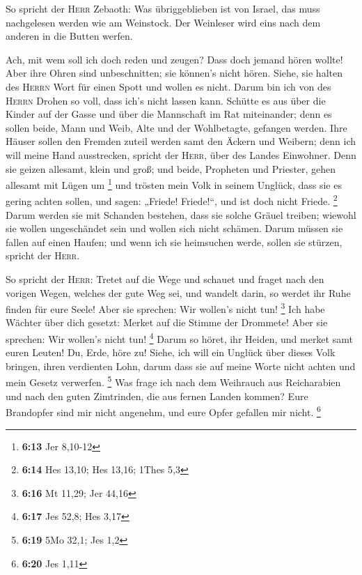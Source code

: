  So spricht der \textsc{Herr} Zebaoth: Was übriggeblieben
ist von Israel, das muss nachgelesen werden wie am Weinstock. Der
Weinleser wird eins nach dem anderen in die Butten werfen.

 Ach, mit wem soll ich doch reden und zeugen? Dass doch
jemand hören wollte! Aber ihre Ohren sind unbeschnitten; sie können's
nicht hören. Siehe, sie halten des \textsc{Herrn} Wort für einen Spott
und wollen es nicht.  Darum bin ich von des
\textsc{Herrn} Drohen so voll, dass ich's nicht lassen kann. Schütte es
aus über die Kinder auf der Gasse und über die Mannschaft im Rat
miteinander; denn es sollen beide, Mann und Weib, Alte und der
Wohlbetagte, gefangen werden.  Ihre Häuser sollen den
Fremden zuteil werden samt den Äckern und Weibern; denn ich will meine
Hand ausstrecken, spricht der \textsc{Herr}, über des Landes Einwohner.
 Denn sie geizen allesamt, klein und groß; und beide,
Propheten und Priester, gehen allesamt mit Lügen um \footnote{\textbf{6:13}
  Jer 8,10-12}  und trösten mein Volk in seinem Unglück,
dass sie es gering achten sollen, und sagen: „Friede! Friede!{}``, und
ist doch nicht Friede. \footnote{\textbf{6:14} Hes 13,10; Hes 13,16;
  1Thes 5,3}  Darum werden sie mit Schanden bestehen,
dass sie solche Gräuel treiben; wiewohl sie wollen ungeschändet sein und
wollen sich nicht schämen. Darum müssen sie fallen auf einen Haufen; und
wenn ich sie heimsuchen werde, sollen sie stürzen, spricht der
\textsc{Herr}.

 So spricht der \textsc{Herr}: Tretet auf die Wege und
schauet und fraget nach den vorigen Wegen, welches der gute Weg sei, und
wandelt darin, so werdet ihr Ruhe finden für eure Seele! Aber sie
sprechen: Wir wollen's nicht tun! \footnote{\textbf{6:16} Mt 11,29; Jer
  44,16}  Ich habe Wächter über dich gesetzt: Merket auf
die Stimme der Drommete! Aber sie sprechen: Wir wollen's nicht tun!
\footnote{\textbf{6:17} Jes 52,8; Hes 3,17}  Darum so
höret, ihr Heiden, und merket samt euren Leuten!  Du,
Erde, höre zu! Siehe, ich will ein Unglück über dieses Volk bringen,
ihren verdienten Lohn, darum dass sie auf meine Worte nicht achten und
mein Gesetz verwerfen. \footnote{\textbf{6:19} 5Mo 32,1; Jes 1,2}
 Was frage ich nach dem Weihrauch aus Reicharabien und
nach den guten Zimtrinden, die aus fernen Landen kommen? Eure Brandopfer
sind mir nicht angenehm, und eure Opfer gefallen mir nicht. \footnote{\textbf{6:20}
  Jes 1,11}

